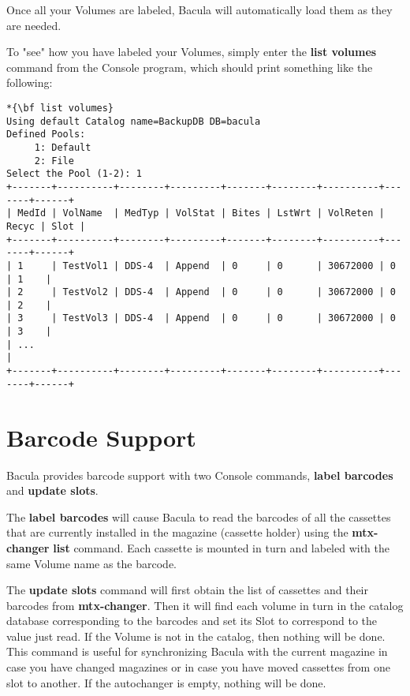 Once all your Volumes are labeled, Bacula will automatically load them as they
are needed. 

To "see" how you have labeled your Volumes, simply enter the {\bf list
volumes} command from the Console program, which should print something like
the following: 

\footnotesize
\begin{verbatim}
*{\bf list volumes}
Using default Catalog name=BackupDB DB=bacula
Defined Pools:
     1: Default
     2: File
Select the Pool (1-2): 1
+-------+----------+--------+---------+-------+--------+----------+-------+------+
| MedId | VolName  | MedTyp | VolStat | Bites | LstWrt | VolReten | Recyc | Slot |
+-------+----------+--------+---------+-------+--------+----------+-------+------+
| 1     | TestVol1 | DDS-4  | Append  | 0     | 0      | 30672000 | 0     | 1    |
| 2     | TestVol2 | DDS-4  | Append  | 0     | 0      | 30672000 | 0     | 2    |
| 3     | TestVol3 | DDS-4  | Append  | 0     | 0      | 30672000 | 0     | 3    |
| ...                                                                            |
+-------+----------+--------+---------+-------+--------+----------+-------+------+
\end{verbatim}
\normalsize

\label{Barcodes}

\section{Barcode Support}

Bacula provides barcode support with two Console commands, {\bf label
barcodes} and {\bf update slots}.

The {\bf label barcodes} will cause Bacula to read the barcodes of all the
cassettes that are currently installed in the magazine (cassette holder) using
the {\bf mtx-changer} {\bf list} command. Each cassette is mounted in turn and
labeled with the same Volume name as the barcode. 

The {\bf update slots} command will first obtain the list of cassettes and
their barcodes from {\bf mtx-changer}. Then it will find each volume in turn
in the catalog database corresponding to the barcodes and set its Slot to
correspond to the value just read. If the Volume is not in the catalog, then
nothing will be done. This command is useful for synchronizing Bacula with the
current magazine in case you have changed magazines or in case you have moved
cassettes from one slot to another. If the autochanger is empty, nothing will
be done.

